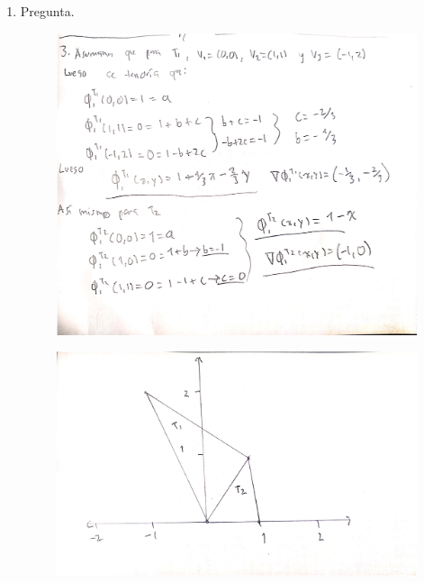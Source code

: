 \documentclass[fleqn]{article}
\begin{document}
\begin{enumerate}
\begin{figure}[H]
        \end{figure}
  \item Pregunta.
        \begin{figure}[H]
          \centering \includegraphics[scale=.4]{figs/31}
        \end{figure}
        \begin{figure}[H]
          \centering \includegraphics[scale=.4]{figs/32}
        \end{figure}
\end{enumerate}
\end{document}
